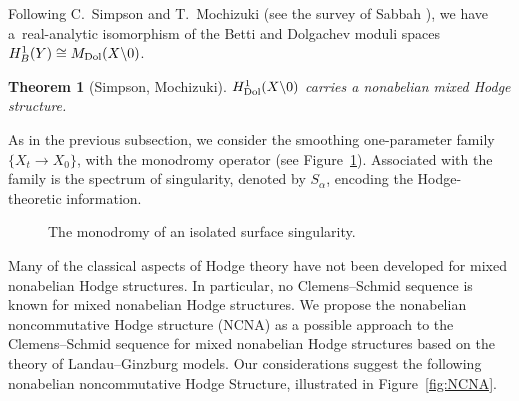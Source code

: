 \documentclass[10pt,a4paper]{amsart}
\newtheorem{Theorem}{Theorem}[section]
\begin{document}
Following C.~Simpson \cite{Sim97} and T.~Mochizuki (see the survey of Sabbah \cite{Sab11}), we have a~real-analytic isomorphism of the Betti and Dolgachev moduli spaces
$H^1_B (Y) \cong M_{\rm Dol}(X {\setminus} 0)$.

\begin{Theorem}[Simpson, Mochizuki]
	$H^1_{\rm Dol}(X {\setminus} 0)$ carries a nonabelian mixed Hodge structure.
\end{Theorem}

As in the previous subsection, we consider the smoothing one-parameter family
$
	\{X_t \to X_0\}$,
with the monodromy operator (see Figure~\ref{fig:monodromy}). Associated with the family is the spectrum of singularity, denoted by $S_{\alpha}$, encoding the Hodge-theoretic information.

\begin{figure}[ht]
	\centering
	\caption{The monodromy of an isolated surface singularity.}
	\label{fig:monodromy}
\end{figure}


Many of the classical aspects of Hodge theory have not been developed for mixed nonabelian Hodge structures. In particular, no Clemens--Schmid sequence is known for mixed nonabelian Hodge structures. We propose the nonabelian noncommutative Hodge structure (NCNA) as a possible approach to the Clemens--Schmid sequence for mixed nonabelian Hodge structures based on the theory of Landau--Ginzburg models. Our considerations suggest the following nonabelian noncommutative Hodge Structure, illustrated in Figure~\ref{fig:NCNA}.
\end{document}
